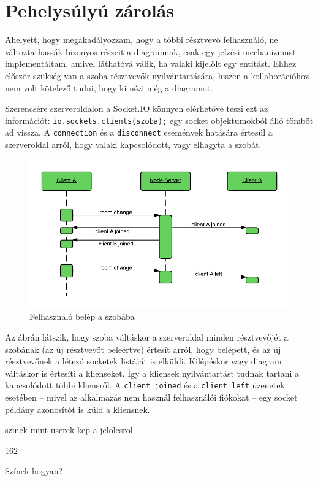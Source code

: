 
\section{Pehelysúlyú zárolás}

Ahelyett, hogy megakadályozzam, hogy a többi résztvevő felhasználó, ne változtathassák bizonyos részeit a diagramnak, csak egy jelzési mechanizmust implementáltam, amivel láthatóvá válik, ha valaki kijelölt egy entitást. Ehhez először szükség van a szoba résztvevők nyilvántartására, hiszen a kollaborációhoz nem volt kötelező tudni, hogy ki nézi még a diagramot.

Szerencsére szerveroldalon a Socket.IO könnyen elérhetővé teszi ezt az információt: \lstinline{io.sockets.clients(szoba);} egy socket objektumokból álló tömböt ad vissza. A \lstinline{connection} és a \lstinline{disconnect} események hatására értesül a szerveroldal arról, hogy valaki kapcsolódott, vagy elhagyta a szobát.

\begin{figure}[!ht]
\centering
\includegraphics[width=15cm,keepaspectratio]{figures/join-seq.png}
\caption{Felhasználó belép a szobába}
\label{fig:joinseq}
\end{figure}

Az ábrán látszik, hogy szoba váltáskor a szerveroldal minden résztvevőjét a szobának (az új résztvevőt beleértve) értesít arról, hogy belépett, és az új résztvevőnek a létező socketek listáját is elküldi. Kilépéskor vagy diagram váltáskor is értesíti a klienseket. Így a kliensek nyilvántartást tudnak tartani a kapcsolódott többi kliensről. A \lstinline{client joined} és a \lstinline{client left} üzenetek esetében -- mivel az alkalmazás nem használ felhasználói fiókokat -- egy socket példány azonosítót is küld a kliensnek.

szinek mint userek
kep a jelolesrol  

162

Színek hogyan?